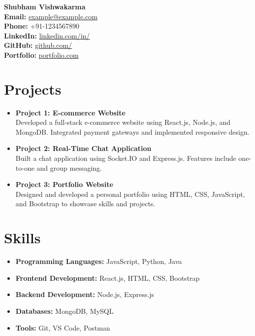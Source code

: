 \documentclass[a4paper,10pt]{article}
\begin{document}
\begin{center}
    {\Huge \textbf{Shubham Vishwakarma}} \\
    \vspace{5pt}
    \textbf{Email:} \href{mailto:example@example.com}{example@example.com} \\
    \textbf{Phone:} +91-1234567890 \\
    \textbf{LinkedIn:} \href{linkedin.com}{linkedin.com/in/} \\
    \textbf{GitHub:} \href{https://github.com/}{github.com/} \\
    \textbf{Portfolio:} \href{https://.com}{portfolio.com} \\
\end{center}

\begin{multicols}{2}

\section*{Projects}
\begin{itemize}[leftmargin=*]
    \item \textbf{Project 1: E-commerce Website} \\
        Developed a full-stack e-commerce website using React.js, Node.js, and MongoDB. Integrated payment gateways and implemented responsive design.
    \item \textbf{Project 2: Real-Time Chat Application} \\
        Built a chat application using Socket.IO and Express.js. Features include one-to-one and group messaging.
    \item \textbf{Project 3: Portfolio Website} \\
        Designed and developed a personal portfolio using HTML, CSS, JavaScript, and Bootstrap to showcase skills and projects.
\end{itemize}

\section*{Skills}
\begin{itemize}[leftmargin=*]
    \item \textbf{Programming Languages:} JavaScript, Python, Java
    \item \textbf{Frontend Development:} React.js, HTML, CSS, Bootstrap
    \item \textbf{Backend Development:} Node.js, Express.js
    \item \textbf{Databases:} MongoDB, MySQL
    \item \textbf{Tools:} Git, VS Code, Postman
\end{itemize}


\end{multicols}
\end{document}
